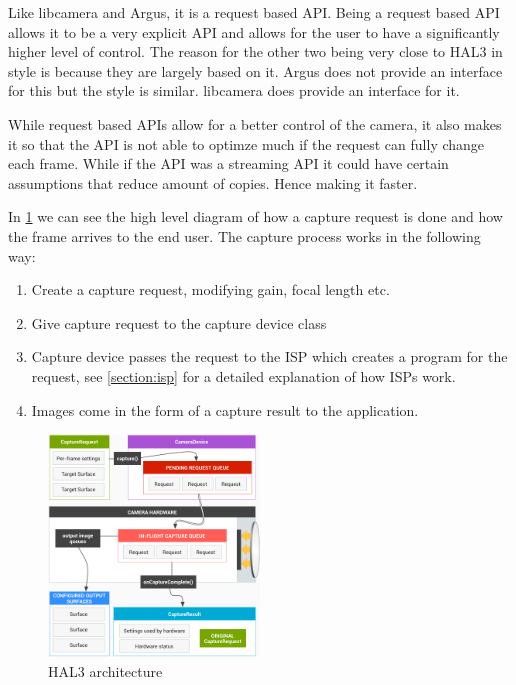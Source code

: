 Like libcamera and Argus, it is a request based API. Being a request based API
allows it to be a very explicit API and allows for the user to have a
significantly higher level of control. The reason for the other
two being very close to HAL3 in style is because they are largely based on it.
Argus does not provide an interface for this but the style is similar. libcamera
does provide an interface for it.

While request based APIs allow for a better control of the camera, it also
makes it so that the API is not able to optimze much if the request can fully
change each frame. While if the API was a streaming API it could have certain
assumptions that reduce amount of copies. Hence making it faster.

In \cref{fig:hal3arch} we can see the high level diagram of how a capture
request is done and how the frame arrives to the end user. The capture process
works in the following way:

\begin{enumerate}
    \item Create a capture request, modifying gain, focal length etc.
    \item Give capture request to the capture device class
    \item Capture device passes the request to the ISP which creates a program
        for the request, see \cref{section:isp} for a detailed explanation of
        how ISPs work.

    \item Images come in the form of a capture result to the application.
\end{enumerate}


\begin{figure}
    \begin{center}
        \includegraphics[width=0.5\textwidth]{figures/hal3arch}
    \end{center}
    \caption{HAL3 architecture \cite{hal3arch}}\label{fig:hal3arch}
\end{figure}

